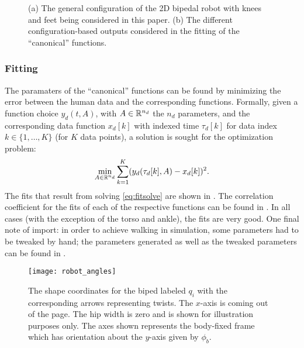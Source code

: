 \begin{figure}[t!]
  \centering
  \hspace{.2cm}
  \caption{(a) The general configuration of the 2D bipedal robot with knees and feet being considered in this paper. (b) The different configuration-based outputs considered in the fitting of the ``canonical'' functions.}
    \label{fig:robotconstraints}
\end{figure}

\subsubsection{Fitting} The paramaters of the ``canonical'' functions can be found by minimizing the error between the human data and the corresponding functions. Formally, given a function choice $y_d(t, A)$, with $A \in \mathbb{R}^{n_{d}}$ the $n_d$ parameters, and the corresponding data function $x_{d}[k]$ with indexed time $\tau_{d}[k]$ for data index $k \in \{1, \ldots, K\}$ (for $K$ data points),  a solution is sought for the optimization problem:
\begin{align}
  \label{eq:fitsolve}
  \min_{A \in \mathbb{R}^{n_{d}}} \sum_{k=1}^{K} (y_{d}(\tau_{d}[k], A) - x_{d}[k])^2.
\end{align}
The fits that result from solving \eqref{eq:fitsolve} are shown in . The correlation coefficient for the fits of each of the respective functions can be found in . In all cases (with the exception of the torso and ankle), the fits are very good. One final note of import: in order to achieve walking in simulation, some parameters had to be tweaked by hand; the parameters generated as well as the tweaked parameters can be found in .

\begin{figure}
  \centering
  \texttt{[image: robot\_angles]}
  \caption{The shape coordinates for the biped labeled $q_i$ with the corresponding arrows representing twists. The $x$-axis is coming out of the page. The hip width is zero and is shown for illustration purposes only. The axes shown represents the body-fixed frame which has orientation about the $y$-axis given by $\phi_b$.}
  \label{fig:shapecoords}
\end{figure}

